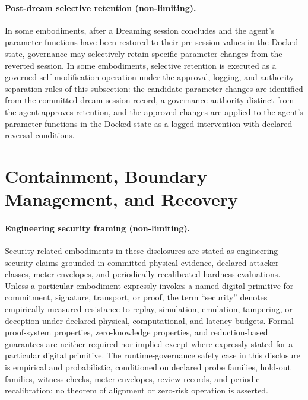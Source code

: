 \documentclass[a4paper,12pt]{article}
\begin{document}
\paragraph{Post-dream selective retention (non-limiting).}
In some embodiments, after a Dreaming session concludes and the
agent's parameter functions have been restored to their pre-session
values in the Docked state, governance may selectively retain specific
parameter changes from the reverted session. In some embodiments,
selective retention is executed as a governed self-modification
operation under the approval, logging, and authority-separation rules
of this subsection: the candidate parameter changes are identified
from the committed dream-session record, a governance authority
distinct from the agent approves retention, and the approved changes
are applied to the agent's parameter functions in the Docked state
as a logged intervention with declared reversal conditions.

\section{Containment, Boundary Management, and Recovery}
\label{sec:containment}


\paragraph{Engineering security framing (non-limiting).}
\label{sec:engineering-security}
Security-related embodiments in these disclosures are stated as
engineering security claims grounded in committed physical evidence,
declared attacker classes, meter envelopes, and periodically
recalibrated hardness evaluations. Unless a particular embodiment
expressly invokes a named digital primitive for commitment,
signature, transport, or proof, the term ``security'' denotes
empirically measured resistance to replay, simulation, emulation,
tampering, or deception under declared physical, computational, and
latency budgets. Formal proof-system properties, zero-knowledge
properties, and reduction-based guarantees are neither required
nor implied except where expressly stated for a particular digital
primitive. The runtime-governance safety case in this disclosure is
empirical and probabilistic, conditioned on declared probe families,
hold-out families, witness checks, meter envelopes, review records,
and periodic recalibration; no theorem of alignment or zero-risk
operation is asserted.
\end{document}
